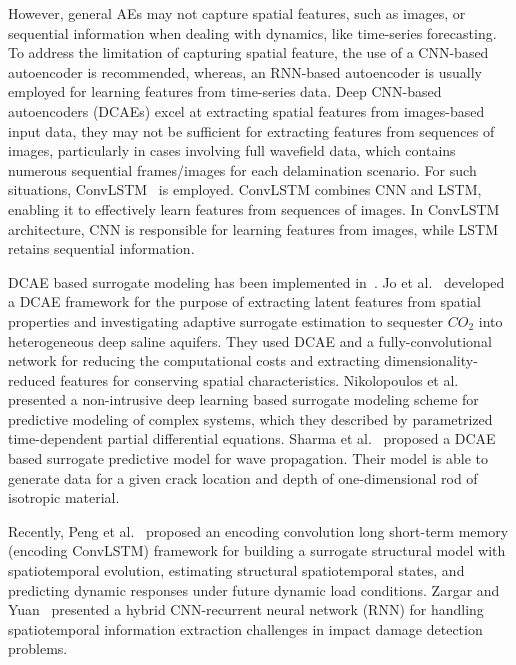 However, general AEs may not capture spatial features, such as images, or sequential information when dealing with dynamics, like time-series forecasting. 
To address the limitation of capturing spatial feature, the use of a CNN-based autoencoder is recommended, whereas, an RNN-based autoencoder is usually employed for learning features from time-series data.
Deep CNN-based autoencoders (DCAEs) excel at extracting spatial features from images-based input data, they may not be sufficient for extracting features from sequences of images, particularly in cases involving full wavefield data, which contains numerous sequential frames/images for each delamination scenario. 
For such situations, ConvLSTM~\cite{shi2015convolutional} is employed. 
ConvLSTM combines CNN and LSTM, enabling it to effectively learn features from sequences of images. 
In ConvLSTM architecture, CNN is responsible for learning features from images, while LSTM retains sequential information.

DCAE based surrogate modeling has been implemented in~\cite{jo2021adaptive, nikolopoulos2022non, sharma2022wave}. 
Jo et al.~\cite{jo2021adaptive} developed a DCAE framework for the purpose of extracting latent features from spatial properties and investigating adaptive surrogate estimation to sequester $CO_2$ into heterogeneous deep saline aquifers. 
They used DCAE and a fully-convolutional network for reducing the computational costs and extracting dimensionality-reduced features for conserving spatial characteristics. 
Nikolopoulos et al.~\cite{nikolopoulos2022non} presented a non-intrusive deep learning based surrogate modeling scheme for predictive modeling of complex systems, which they described by parametrized time-dependent partial differential equations. 
Sharma et al.~\cite{sharma2022wave} proposed a DCAE based surrogate predictive model for wave propagation. 
Their model is able to generate data for a given crack location and depth
of one-dimensional rod of isotropic material.

Recently, Peng et al.~\cite{peng2021structural} proposed an encoding convolution long short-term memory (encoding ConvLSTM) framework for building a surrogate structural model with spatiotemporal evolution, estimating structural spatiotemporal states, and predicting dynamic responses under future dynamic load conditions. 
Zargar and Yuan~\cite{zargar2021impact} presented a hybrid CNN-recurrent neural network (RNN) for handling spatiotemporal information extraction challenges in impact damage detection problems.

